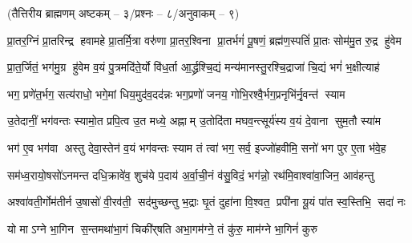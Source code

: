 

\centerline{\normalsize(तैत्तिरीय ब्राह्मणम् अष्टकम् – ३/प्रश्नः – ८/अनुवाकम् – ९)}


\twolineshloka
{प्रा॒तर॒ग्निं प्रा॒तरिन्द्र हवामहे प्रा॒तर्मि॒त्रा वरु॑णा प्रा॒तर॒श्विना}
{प्रा॒तर्भगं॑ पू॒षणं॒ ब्रह्म॑ण॒स्पतिं॑ प्रा॒तः सोम॑मु॒त रु॒द्र हु॑वेम}

\twolineshloka
{प्रा॒त॒र्जितं॒ भग॑मु॒ग्र हु॑वेम व॒यं पु॒त्रमदि॑ते॒र्यो वि॑ध॒र्ता}
{आ॒र्द्ध्रश्चि॒द्यं मन्य॑मानस्तु॒रश्चि॒द्राजा॑ चि॒द्यं भगं॑ भ॒क्षीत्याह॑}

\twolineshloka
{भग॒ प्रणे॑त॒र्भग॒ सत्य॑राधो॒ भगे॒मां धिय॒मुद॑व॒दद॑न्नः}
{भग॒प्रणो॑ जनय॒ गोभि॒रश्वै॒र्भग॒प्रनृभि॑र्नृ॒वन्त॑ स्याम}

\twolineshloka
{उ॒तेदानीं॒ भग॑वन्तः स्यामो॒त प्रपि॒त्व उ॒त मध्ये॒ अह्नाम्}
{उ॒तोदि॑ता मघव॒न्त्सूर्य॑स्य व॒यं दे॒वाना सुम॒तौ स्या॑म}

\twolineshloka
{भग॑ ए॒व भग॑वा अस्तु देवा॒स्तेन॑ व॒यं भग॑वन्तः स्याम}
{तं त्वा॑ भग॒ सर्व॒ इज्जो॑हवीमि॒ सनो॑ भग पुर ए॒ता भ॑वे॒ह}

\twolineshloka
{सम॑ध्व॒रायो॒षसो॑ऽनमन्त दधि॒क्रावे॑व॒ शुच॑ये प॒दाय॑}
{अ॒र्वा॒ची॒नं व॑सु॒विदं॒ भग॑न्नो॒ रथ॑मि॒वाश्वा॑वा॒जिन॒ आव॑हन्तु}

\twolineshloka
{अश्वा॑वती॒र्गोम॑तीर्न उ॒षासो॑ वी॒रव॑ती॒ सद॑मुच्छन्तु भ॒द्राः}
{घृ॒तं दुहा॑ना वि॒श्वत॒ प्रपी॑ना यू॒यं पा॑त स्व॒स्तिभि॒ सदा॑ नः}

\twolineshloka
{यो माऽग्ने भा॒गिन स॒न्तमथा॑भा॒गं चिकी॑र्‌षति}
{अभा॒गम॑ग्ने॒ तं कु॑रु॒ माम॑ग्ने भा॒गिनं॑ कुरु}

